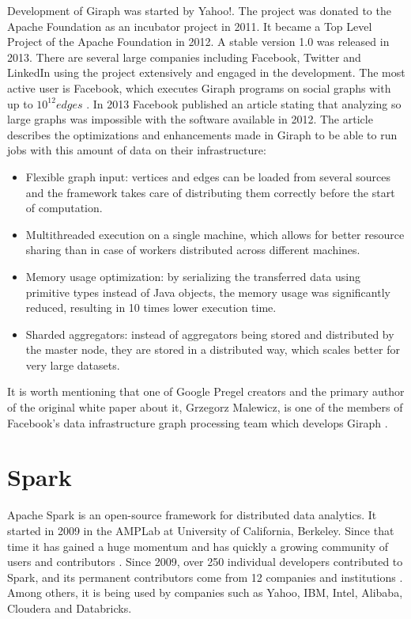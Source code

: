 Development of Giraph was started by Yahoo!. The project was donated to the Apache Foundation as an incubator project in 2011. It became a Top Level Project of the Apache Foundation in 2012. A stable version 1.0 was released in 2013. There are several large companies including Facebook, Twitter and LinkedIn using the project extensively and engaged in the development. The most active user is Facebook, which executes Giraph programs on social graphs with up to $10^{12} edges$ \cite{giraphfb}. In 2013 Facebook published an article \cite{giraphfb} stating that analyzing so large graphs was impossible with the software available in 2012. The article describes the optimizations and enhancements made in Giraph to be able to run jobs with this amount of data on their infrastructure:
\begin{itemize}
\item Flexible graph input: vertices and edges can be loaded from several sources and the framework takes care of distributing them correctly before the start of computation.
\item Multithreaded execution on a single machine, which allows for better resource sharing than in case of workers distributed across different machines.
\item Memory usage optimization: by serializing the transferred data using primitive types instead of Java objects, the memory usage was significantly reduced, resulting in 10 times lower execution time.
\item Sharded aggregators: instead of aggregators being stored and distributed by the master node, they are stored in a distributed way, which scales better for very large datasets.
\end{itemize}
It is worth mentioning that one of Google Pregel creators and the primary author of the original white paper about it, Grzegorz Malewicz, is one of the members of Facebook's data infrastructure graph processing team which develops Giraph \cite{giraphfb}.

\section{Spark}
Apache Spark \cite{spark, spark2} is an open-source framework for distributed data analytics. It started in 2009 in the AMPLab at University of California, Berkeley. Since that time it has gained a huge momentum and has quickly a growing community of users and contributors \cite{sparkgrowingcommunity}. Since 2009, over 250 individual developers contributed to Spark, and its permanent contributors come from 12 companies and institutions \cite{sparkwww}. Among others, it is being used by companies such as Yahoo, IBM, Intel, Alibaba, Cloudera and Databricks.


